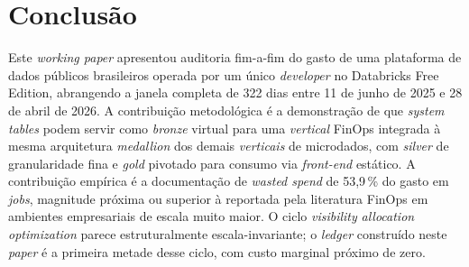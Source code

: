 \documentclass[12pt,a4paper,oneside]{article}
\begin{document}
\section{Conclusão}

Este \textit{working paper} apresentou auditoria fim-a-fim do gasto
de uma plataforma de dados públicos brasileiros operada por um
único \textit{developer} no Databricks Free Edition, abrangendo a
janela completa de 322 dias entre 11 de junho de 2025 e 28 de
abril de 2026. A contribuição metodológica é a demonstração de que
\textit{system tables} podem servir como \textit{bronze} virtual
para uma \textit{vertical} FinOps integrada à mesma arquitetura
\textit{medallion} dos demais \textit{verticais} de microdados, com
\textit{silver} de granularidade fina e \textit{gold} pivotado para
consumo via \textit{front-end} estático. A contribuição empírica é
a documentação de \textit{wasted spend} de 53,9\,\% do gasto em
\textit{jobs}, magnitude próxima ou superior à reportada pela
literatura FinOps em ambientes empresariais de escala muito maior.
O ciclo
\textit{visibility} \textrightarrow{} \textit{allocation}
\textrightarrow{} \textit{optimization} parece estruturalmente
escala-invariante; o \textit{ledger} construído neste \textit{paper}
é a primeira metade desse ciclo, com custo marginal próximo de
zero.

\end{document}
